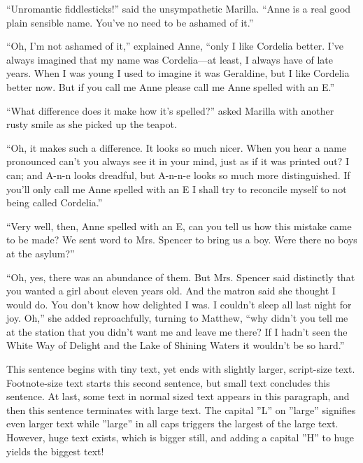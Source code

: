 \documentclass[a4paper]{article}
\begin{document}
``Unromantic fiddlesticks!'' said the unsympathetic Marilla. ``Anne is a real good plain sensible name. You've no need to be ashamed of it.''

``Oh, I'm not ashamed of it,'' explained Anne, ``only I like Cordelia better. I've always imagined that my name was Cordelia—at least, I always have of late years. When I was young I used to imagine it was Geraldine, but I like Cordelia better now. But if you call me Anne please call me Anne spelled with an E.''

``What difference does it make how it's spelled?'' asked Marilla with another rusty smile as she picked up the teapot.

``Oh, it makes such a difference. It looks so much nicer. When you hear a name pronounced can't you always see it in your mind, just as if it was printed out? I can; and A-n-n looks dreadful, but A-n-n-e looks so much more distinguished. If you'll only call me Anne spelled with an E I shall try to reconcile myself to not being called Cordelia.''

``Very well, then, Anne spelled with an E, can you tell us how this mistake came to be made? We sent word to Mrs. Spencer to bring us a boy. Were there no boys at the asylum?''

``Oh, yes, there was an abundance of them. But Mrs. Spencer said distinctly that you wanted a girl about eleven years old. And the matron said she thought I would do. You don't know how delighted I was. I couldn't sleep all last night for joy. Oh,'' she added reproachfully, turning to Matthew, ``why didn't you tell me at the station that you didn't want me and leave me there? If I hadn't seen the White Way of Delight and the Lake of Shining Waters it wouldn't be so hard.''

\tiny This sentence begins with tiny text, \scriptsize yet ends with slightly larger, script-size text. \footnotesize Footnote-size text starts this second sentence, \small but small text concludes this sentence. \normalsize At last, some text in normal sized text appears in this paragraph, \large and then this sentence terminates with large text. \Large The capital ''L'' on ''large'' signifies even larger text \LARGE while ''large'' in all caps triggers the largest of the large text. \huge However, huge text exists, which is bigger still, \Huge and adding a capital ''H'' to huge yields the biggest text!
\end{document}
